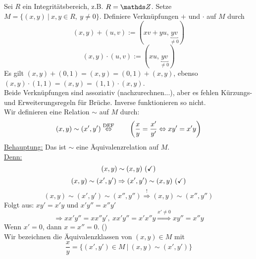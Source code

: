 Sei $R$ ein Integritätsbereich, z.B. $R=\Z$.
Setze $M=\{(x,y)~|~x,y\in R,~y\neq 0\}$.
Definiere Verknüpfungen $+$ und $\cdot$ auf $M$ durch
\[
(x,y)+(u,v):=(xv+yu,\underbracket{yv}_{\neq 0})
\]
\[
(x,y)\cdot (u,v):=(xu,\underbracket{yv}_{\neq 0})
\]
Es gilt $(x,y)+(0,1)=(x,y)=(0,1)+(x,y)$, ebenso $(x,y)\cdot (1,1)=(x,y)=(1,1)\cdot (x,y)$.\\
Beide Verknüpfungen sind assoziativ (nachzurechnen...), aber es fehlen Kürzungs- und Erweiterungsregeln für Brüche.
Inverse funktionieren so nicht.\\
Wir definieren eine Relation $\sim$ auf $M$ durch:
\[
(x,y)\sim(x',y')\stackrel{\text{DEF}}{\Leftrightarrow}\qquad \left( \frac{x}{y}=\frac{x'}{y'}\Leftrightarrow xy'=x'y\right)
\] 
\uline{Behauptung:} Das ist $\sim$ eine Äquivalenzrelation auf $M$.\\
\uline{Denn:} 
\[
(x,y)\sim(x,y)~ (\text{\checkmark})
\]
\[
(x,y)\sim(x',y')\Rightarrow(x',y')\sim(x,y)~ (\text{\checkmark})
\]
\[
(x,y)\sim(x',y')\sim(x'',y'')\stackrel{!}{\Rightarrow}(x,y)\sim(x'',y'')
\]
Folgt aus: $xy'=x'y$ und $x'y''=x''y'$
\[
\Rightarrow xx'y''=xx''y',~ xx'y''=x'x''y \stackrel{x'\neq 0}{\Rightarrow} xy''=x''y
\]
Wenn $x'=0$, dann $x=x''=0$. (\checkmark)\\

Wir bezeichnen die Äquivalenzklassen von $(x,y)\in M$ mit 
\[
\frac{x}{y}=\{(x',y')\in M~|~(x,y)\sim(x',y') \}
\]
































\cleardoubleoddemptypage
{}
\setcounter{page}{1}




\printindex
\listoffigures
